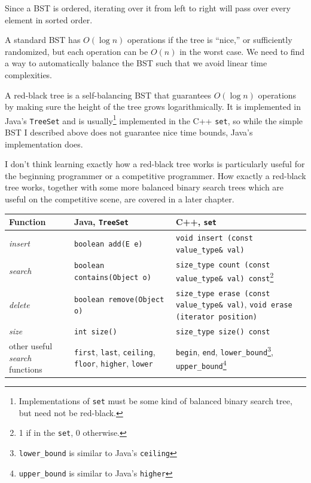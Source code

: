Since a BST is ordered, iterating over it from left to right will pass over every element in sorted order.

A standard BST has $O(\log{n})$ operations if the tree is ``nice,'' or sufficiently randomized, but each operation can be $O(n)$ in the worst case. We need to find a way to automatically balance the BST such that we avoid linear time complexities.

A red-black tree is a self-balancing BST that guarantees $O(\log{n})$ operations by making sure the height of the tree grows logarithmically. It is implemented in Java's \texttt{TreeSet} and is usually\footnote{Implementations of \texttt{set} must be some kind of balanced binary search tree, but need not be red-black.} implemented in the C++ \texttt{set}, so while the simple BST I described above does not guarantee nice time bounds, Java's implementation does.

I don't think learning exactly how a red-black tree works is particularly useful for the beginning programmer or a competitive programmer. How exactly a red-black tree works, together with some more balanced binary search trees which are useful on the competitive scene, are covered in a later chapter.

\begin{center}
    \begin{tabular}{ p{5cm} p{5cm} p{5cm} }
	Function	&	Java, \texttt{TreeSet}	&	C++, \texttt{set} \\
	\hline
	\textit{insert}		&	\texttt{boolean add(E e)}	&	\texttt{void insert (const value\_type\& val)} \\
   \textit{search}		&	\texttt{boolean contains(Object o)}	&	\texttt{size\_type count (const value\_type\& val) const}\footnote{1 if in the \texttt{set}, 0 otherwise.}	\\
    \textit{delete}		&	\texttt{boolean	remove(Object o)}		&	\texttt{size\_type erase (const value\_type\& val)}, \texttt{void erase (iterator position)} \\
    \textit{size} & \texttt{int size()} & \texttt{size\_type size() const} \\
    other useful \textit{search} functions	& \texttt{first}, \texttt{last}, \texttt{ceiling}, \texttt{floor}, \texttt{higher}, \texttt{lower} & \texttt{begin}, \texttt{end}, \texttt{lower\_bound}\footnote{\texttt{lower\_bound} is similar to Java's \texttt{ceiling}}, \texttt{upper\_bound}\footnote{\texttt{upper\_bound} is similar to Java's \texttt{higher}}
    \end{tabular}
\end{center}

